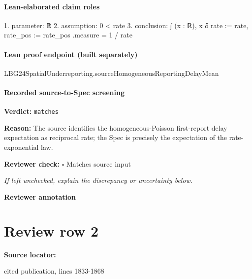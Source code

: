 \documentclass[10pt]{article}
\newcommand{\reviewerbox}{%
  \par\noindent\fbox{\parbox{0.96\linewidth}{\rule{0pt}{0.38in}}}\par
}
\newcommand{\reviewmatch}[1]{%
  \par\noindent\textbf{Reviewer check:} $\square$\; #1\par
  \noindent\emph{If left unchecked, explain the discrepancy or uncertainty below.}\par
}
\begin{document}
\paragraph{Lean-elaborated claim roles}\begin{ReviewVerbatim}
1. parameter: ℝ
2. assumption: 0 < rate
3. conclusion: ∫ (x : ℝ), x ∂{ rate := rate, rate_pos := rate_pos }.measure = 1 / rate
\end{ReviewVerbatim}

\paragraph{Lean proof endpoint (built separately)}\begin{ReviewVerbatim}
LBG24SpatialUnderreporting.sourceHomogeneousReportingDelayMean
\end{ReviewVerbatim}

\paragraph{Recorded source-to-Spec screening}
\textbf{Verdict:} \texttt{matches}
\\
{\raggedright
\textbf{Reason:} The source identifies the homogeneous-\allowbreak{}Poisson first-\allowbreak{}report delay expectation as reciprocal rate;\allowbreak{} the Spec is precisely the expectation of the rate-\allowbreak{}exponential law.\allowbreak{}
\par}
\reviewmatch{Matches source input}
\noindent\textbf{Reviewer annotation}\par
\reviewerbox
\clearpage
\hypertarget{source-claim-7c39e59245058bff}{}
\section*{Review row 2}
\textbf{Source locator:} {\footnotesize\raggedright cited publication, lines 1833-\allowbreak{}1868\par}
\end{document}
